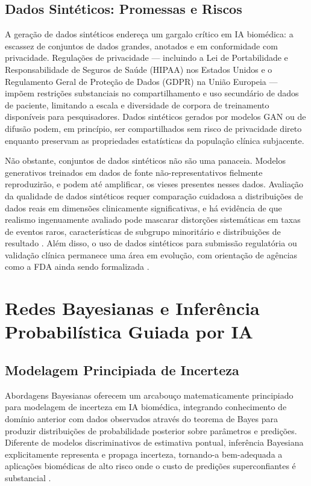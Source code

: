 \subsection{Dados Sintéticos: Promessas e Riscos}

A geração de dados sintéticos endereça um gargalo crítico em IA biomédica: a escassez de conjuntos de dados grandes, anotados e em conformidade com privacidade. Regulações de privacidade --- incluindo a Lei de Portabilidade e Responsabilidade de Seguros de Saúde (HIPAA) nos Estados Unidos e o Regulamento Geral de Proteção de Dados (GDPR) na União Europeia --- impõem restrições substanciais no compartilhamento e uso secundário de dados de paciente, limitando a escala e diversidade de corpora de treinamento disponíveis para pesquisadores. Dados sintéticos gerados por modelos GAN ou de difusão podem, em princípio, ser compartilhados sem risco de privacidade direto enquanto preservam as propriedades estatísticas da população clínica subjacente.

Não obstante, conjuntos de dados sintéticos não são uma panaceia. Modelos generativos treinados em dados de fonte não-representativos fielmente reproduzirão, e podem até amplificar, os vieses presentes nesses dados. Avaliação da qualidade de dados sintéticos requer comparação cuidadosa a distribuições de dados reais em dimensões clinicamente significativas, e há evidência de que realismo ingenuamente avaliado pode mascarar distorções sistemáticas em taxas de eventos raros, características de subgrupo minoritário e distribuições de resultado \parencite{walonoski2018}. Além disso, o uso de dados sintéticos para submissão regulatória ou validação clínica permanece uma área em evolução, com orientação de agências como a FDA ainda sendo formalizada \parencite{fda2023}.

\section{Redes Bayesianas e Inferência Probabilística Guiada por IA}

\subsection{Modelagem Principiada de Incerteza}

Abordagens Bayesianas oferecem um arcabouço matematicamente principiado para modelagem de incerteza em IA biomédica, integrando conhecimento de domínio anterior com dados observados através do teorema de Bayes para produzir distribuições de probabilidade posterior sobre parâmetros e predições. Diferente de modelos discriminativos de estimativa pontual, inferência Bayesiana explicitamente representa e propaga incerteza, tornando-a bem-adequada a aplicações biomédicas de alto risco onde o custo de predições superconfiantes é substancial \parencite{ghahramani2015}.

